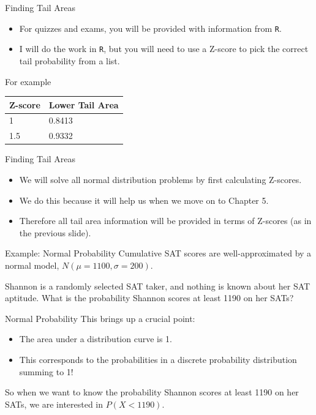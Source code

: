 \begin{frame}{Finding Tail Areas}
    \begin{itemize}
        \item For quizzes and exams, you will be provided with information from \texttt{R}. 
        \item I will do the work in \texttt{R}, but you will need to use a Z-score to pick the correct tail probability from a list.
    \end{itemize}
    For example
    \begin{center}
        \begin{tabular}{l l}
            \hline
            Z-score & Lower Tail Area \\
            \hline
            1 & 0.8413 \\
            1.5 & 0.9332 \\
            \hline
        \end{tabular}
    \end{center}
\end{frame}

\begin{frame}{Finding Tail Areas}
    \begin{itemize}
        \item We will solve all normal distribution problems by first calculating Z-scores.
        \item We do this because it will help us when we move on to Chapter 5.
        \item Therefore all tail area information will be provided in terms of Z-scores (as in the previous slide).
    \end{itemize}
\end{frame}

\begin{frame}{Example: Normal Probability}
    Cumulative SAT scores are well-approximated by a normal model, $N (\mu = 1100, \sigma = 200)$.
    
    \vspace{12pt}Shannon is a randomly selected SAT taker, and nothing is known about her SAT aptitude. What is the probability Shannon scores at least 1190 on her SATs?
\end{frame}

\begin{frame}{Normal Probability}
    This brings up a crucial point:
    \begin{itemize}
        \item The area under a distribution curve is 1. 
        \item This corresponds to the probabilities in a discrete probability distribution summing to 1!
    \end{itemize}
    So when we want to know the probability Shannon scores at least 1190 on her SATs, we are interested in $P(X < 1190)$.
\end{frame}


